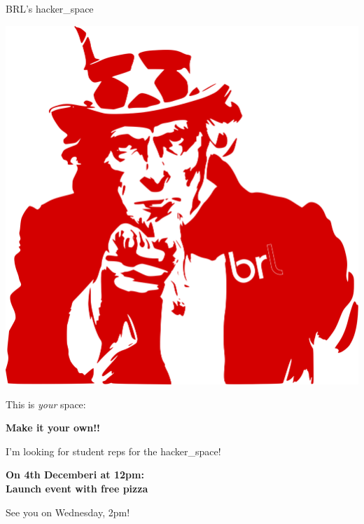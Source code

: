 \documentclass[compress]{beamer}
\begin{document}
\begin{frame}{BRL's hacker\_space}

    \begin{center}
        \includegraphics[width=0.4\linewidth]{needyou}

        \Large

        This is \emph{your} space:

        \textbf{Make it your own!!}

        I'm looking for student reps for the hacker\_space!
    \end{center}
    

\end{frame}

\begin{frame}[plain]


        \Large

        {\bf
        On 4th Decemberi at 12pm:\\        
        Launch event with free pizza
        }

        \pause
        See you on Wednesday, 2pm!


\end{frame}
\end{document}
